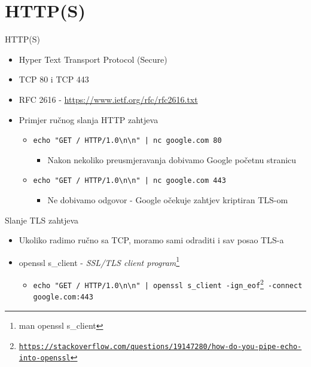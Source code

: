 \documentclass[t]{beamer}
\begin{document}
\section{HTTP(S)}

\begin{frame}{HTTP(S)}
    \begin{itemize}
        \item Hyper Text Transport Protocol (Secure)
        \item TCP 80 i TCP 443
        \item RFC 2616 - \url{https://www.ietf.org/rfc/rfc2616.txt}
        \item Primjer ručnog slanja HTTP zahtjeva
        \begin{itemize}
            \item \texttt{echo "GET / HTTP/1.0\textbackslash{n}\textbackslash{n}" | nc google.com 80}
            \begin{itemize}
                \item Nakon nekoliko preusmjeravanja dobivamo Google početnu stranicu
            \end{itemize}
            \item \texttt{echo "GET / HTTP/1.0\textbackslash{n}\textbackslash{n}" | nc google.com 443}
            
            \begin{itemize}
                \item Ne dobivamo odgovor - Google očekuje zahtjev kriptiran TLS-om
            \end{itemize}
        \end{itemize}
    \end{itemize}
\end{frame}

\begin{frame}{Slanje TLS zahtjeva}
    \begin{itemize}
        \item Ukoliko radimo ručno sa TCP, moramo sami odraditi i sav posao TLS-a
        \item openssl s\_client - \textit{SSL/TLS client program}\footnote{man openssl s\_client}
        \begin{itemize}
            \item \texttt{echo "GET / HTTP/1.0\textbackslash{n}\textbackslash{n}" | openssl s\_client -ign\_eof\footnote{\url{https://stackoverflow.com/questions/19147280/how-do-you-pipe-echo-into-openssl}} -connect google.com:443}
        \end{itemize}
    \end{itemize}
\end{frame}
\end{document}
